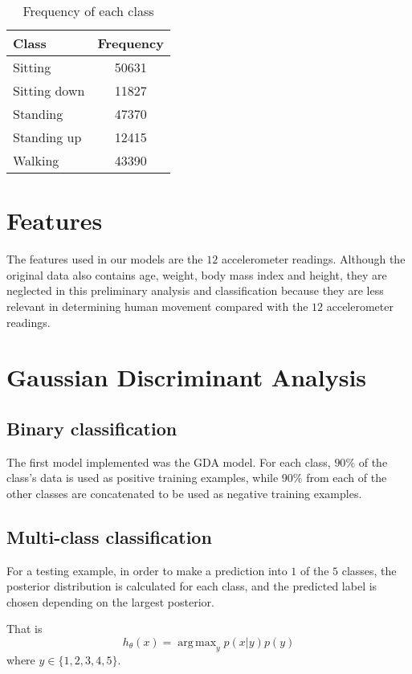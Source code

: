 \documentclass[a4paper, 11pt]{article}
\DeclareMathOperator{\argmax}{arg\,max}
\begin{document}
\begin{table}[!h]
  \centering
  \caption{Frequency of each class}
  \begin{tabular}[]{|l|c|} \hline
    \bf {Class} & \bf {Frequency} \\ \hline
    Sitting & 50631 \\ \hline
    Sitting down & 11827 \\ \hline
    Standing & 47370 \\ \hline
    Standing up & 12415 \\ \hline
    Walking & 43390 \\ \hline
  \end{tabular}
\end{table}

\section{Features}
The features used in our models are the $12$ accelerometer readings. Although the original data also contains age, weight, body mass index and height, they are neglected in this preliminary analysis and classification because they are less relevant in determining human movement compared with the $12$ accelerometer readings.

\section{Gaussian Discriminant Analysis}
\subsection{Binary classification}
The first model implemented was the GDA model. For each class,
$90\%$ of the class's data is used as positive training examples,
while $90\%$ from each of the other classes are concatenated 
to be used as negative training examples.
\subsection{Multi-class classification}
For a testing example, in order to make a prediction into 
$1$ of the $5$ classes, the posterior distribution is calculated for
each class, and the predicted label is chosen depending on the largest
posterior.

That is
\begin{equation*}
  h_\theta(x) = \argmax_y p(x|y)p(y)
\end{equation*} where $y \in \lbrace 1,2,3,4,5 \rbrace$.
\end{document}
